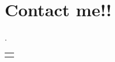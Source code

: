 \section{Contact me!!}

.\\[.3cm]
\begin{tabular}{r l}
	
	\multicolumn{2}{c}{
		\href{https://www.yourwebsite.com/}{\textcolor{Website}{\huge{\faWordpress}}}
		\quad
		\href{https://github.com/}{\textcolor{Github}{\huge{\faGithub}}}
		\quad
		\href{https://www.linkedin.com/}{\textcolor{Linkedin}{\huge{\faLinkedinSquare}}}
		\quad
		\href{https://www.skype.com/}{\textcolor{Skype}{\huge{\faSkype}}}
		\quad
		\href{https://twitter.com/}{\textcolor{Twitter}{\huge{\faTwitter}}}
		\quad
		\href{https://www.youtube.com/}{\textcolor{Youtube}{\huge{\faYoutubePlay}}}
		\quad
		\href{https://www.facebook.com/}{\textcolor{Facebook}{\huge{\faFacebookSquare}}}
	}
\end{tabular}
